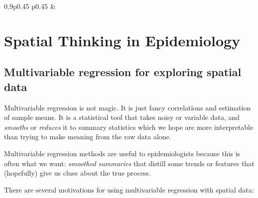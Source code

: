 \documentclass[
]{book}
\begin{document}
\begin{table}[ht]
\begin{centerbox}
\begin{threeparttable}
\begin{tabularx}{0.9\textwidth}{p{} p{}}
 &
 \tabularnewline[-0.5pt]


\end{tabularx}
\end{threeparttable}\par\end{centerbox}

\end{table}
 

\hypertarget{spatial-thinking-in-epidemiology-7}{%
\section{Spatial Thinking in Epidemiology}\label{spatial-thinking-in-epidemiology-7}}

\hypertarget{multivariable-regression-for-exploring-spatial-data}{%
\subsection{Multivariable regression for exploring spatial data}\label{multivariable-regression-for-exploring-spatial-data}}

Multivariable regression is not magic. It is just fancy correlations and estimation of sample means. It is a statistical tool that takes noisy or variable data, and \emph{smooths} or \emph{reduces} it to summary statistics which we hope are more interpretable than trying to make meaning from the raw data alone.

Multivariable regression methods are useful to epidemiologists because this is often what we want: \emph{smoothed summaries} that distill some trends or features that (hopefully) give us clues about the true process.

There are several motivations for using multivariable regression with spatial data:
\end{document}
